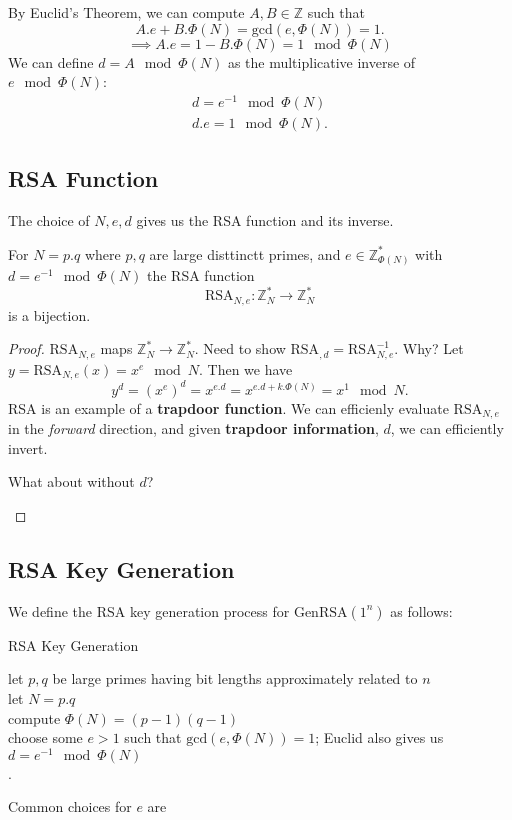By Euclid's Theorem, we can compute \(A, B \in \mathbb{Z}\) such that
\[
    A.e + B.\Phi (N) = \text{gcd}(e, \Phi (N)) = 1.
\]
\[
    \implies A.e = 1 - B.\Phi (N) = 1 \mod \Phi (N)
\]
We can define \(d=A \mod \Phi (N)\) as the multiplicative inverse of \(e \mod \Phi (N)\):
\begin{align*}
    d = e^{-1} \mod \Phi (N) \\
    d.e = 1 \mod \Phi (N).
\end{align*}

\subsection{RSA Function}
The choice of \(N, e, d\) gives us the RSA function and its inverse.

\begin{definition}
    For \(N = p . q\) where \(p, q\) are large disttinctt primes, and \(e \in \mathbb{Z} _{\Phi (N)}^*\) with \(d=e^{-1} \mod \Phi (N)\) the RSA function
    \[
        \text{RSA}_{N,e}: \mathbb{Z}_N^* \to \mathbb{Z} _N^*
    \]
    is a bijection.
\end{definition}
\begin{proof}
    \(\text{RSA} _{N,e}\) maps \(\mathbb{Z} _N^* \to \mathbb{Z} _N^*\). Need to show \(\text{RSA} _{,d} = \text{RSA}_{N,e}^{-1}\). Why? Let \(y=\text{RSA} _{N,e}(x)=x^e \mod N\). Then we have
    \[
        y^d = (x^e)^d = x^{e.d} = x^{e.d + k. \Phi (N)} = x^1 \mod N.
    \]
    RSA is an example of a \textbf{trapdoor function}. We can efficienly evaluate \(\text{RSA}_{N,e} \) in the \emph{forward} direction, and given \textbf{trapdoor information}, \(d\), we can efficiently invert.
    \begin{remark}
        What about without \(d\)?
    \end{remark}   
\end{proof}

\subsection{RSA Key Generation}
We define the RSA key generation process for \(\text{GenRSA} (1^n)\) as follows:

\begin{algorithm}[H]\label{RSAKeyGen}
	\DontPrintSemicolon
	\caption{RSA Key Generation}
    let \(p, q\) be large primes having bit lengths approximately related to \(n\) \\
    let \(N=p.q\)\\
    compute \(\Phi (N) = (p-1)(q-1)\) \\
    choose some \(e > 1\) such that \(\text{gcd} (e, \Phi (N)) = 1\); Euclid also gives us \(d=e^{-1} \mod \Phi (N)\) \\
    .  
\end{algorithm}
\begin{remark}
    Common choices for \(e\) are 
\end{remark}

